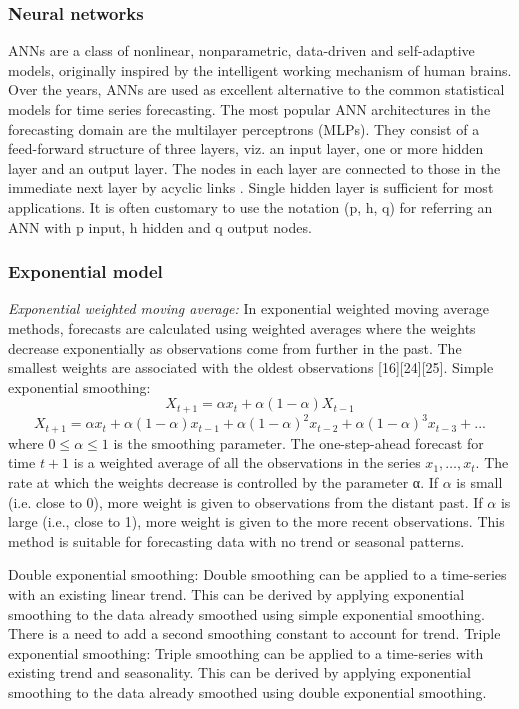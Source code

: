 \subsubsection{Neural networks}
ANNs are a class of nonlinear, nonparametric, data-driven and self-adaptive models, originally inspired by the intelligent working mechanism of human brains. Over the years, ANNs are used as excellent alternative to the common statistical models for time series forecasting. The most popular ANN architectures in the forecasting domain are the multilayer perceptrons (MLPs). They consist of a feed-forward structure of three layers, viz. an input layer, one or more hidden layer and an output layer. The nodes in each layer are connected to those in the immediate next layer by acyclic links . Single hidden layer is sufficient for most applications. It is often customary to use the notation (p, h, q) for referring an ANN with p input, h hidden and q output nodes.

\subsubsection{Exponential model}
\textit{Exponential weighted moving average:}
In exponential weighted moving average methods, forecasts are calculated using weighted averages where the weights decrease exponentially as observations come from further in the past. The smallest weights are associated with the oldest observations [16][24][25].
Simple exponential smoothing:
	$$X_{t+1}=\alpha x_t +\alpha(1-\alpha)X_{t-1}$$
	$$X_{t+1}=\alpha x_t +\alpha(1-\alpha)x_{t-1}+\alpha(1-\alpha)^2x_{t-2}+\alpha(1-\alpha)^3x_{t-3}+...$$
where $0\leq \alpha \leq 1$ is the smoothing parameter. The one-step-ahead forecast for time $t+1$ is a weighted average of all the observations in the series $x_1, …, x_t$. The rate at which the weights decrease is controlled by the parameter α. If $\alpha$ is small (i.e. close to 0), more weight is given to observations from the distant past. If $\alpha$ is large (i.e., close to 1), more weight is given to the more recent observations. This method is suitable for forecasting data with no trend or seasonal patterns.

Double exponential smoothing: Double smoothing can be applied to a time-series with an existing linear trend. This can be derived by applying exponential smoothing to the data already smoothed using simple exponential smoothing. There is a need to add a second smoothing constant to account for trend.
Triple exponential smoothing: Triple smoothing can be applied to a time-series with existing trend and seasonality. This can be derived by applying exponential smoothing to the data already smoothed using double exponential smoothing.


